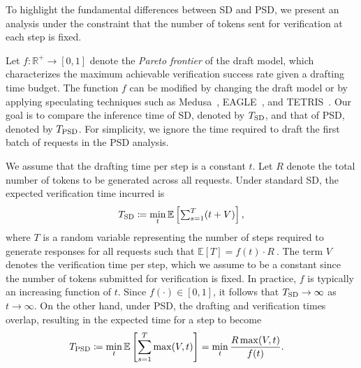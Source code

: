 

To highlight the fundamental differences between SD and PSD, we present an analysis under the constraint that the number of tokens sent for verification at each step is fixed.

Let $f: \mathbb{R}^+\to [0,1]$ denote the \textit{Pareto frontier} of the draft model, which characterizes the maximum achievable verification success rate given a drafting time budget. 
The function $f$ can be modified by changing the draft model or by applying speculating techniques such as Medusa~\citep{cai2024medusa}, EAGLE~\citep{li2024eagle}, and TETRIS~\citep{wu2025tetris}. 
Our goal is to compare the inference time of SD, denoted by $T_{\textnormal{\text{SD}}}$, and that of PSD, denoted by $T_{\textnormal{\text{PSD}}}$. For simplicity, we ignore the time required to draft the first batch of requests in the PSD analysis.


We assume that the drafting time per step is a constant $t$. Let $R$ denote the total number of tokens to be generated across all requests. Under standard SD, the expected verification time incurred is
\begin{equation*}
    \begin{aligned}
       \textstyle T_{\textnormal{\text{SD}}} \coloneqq \min\limits_t\mathbb{E}\left[\sum_{s=1}^T (t + V)\right],
    \end{aligned}
\end{equation*}
where $T$ is a random variable representing the number of steps required to generate responses for all requests such that $\mathbb{E}[T] = f(t) \cdot R\ $. The term $V$ denotes the verification time per step, which we assume to be a constant since the number of tokens submitted for verification is fixed. In practice, $f$ is typically an increasing function of $t$. Since $f(\cdot) \in [0, 1]$, it follows that $T_{\textnormal{\text{SD}}} \to \infty$ as $t \to \infty$. 
On the other hand, under PSD, the drafting and verification times overlap, resulting in the expected time for a step to become
\begin{equation*}
    \begin{aligned}
    \textstyle T_{\textnormal{\text{PSD}}} &\coloneqq \min_t\mathbb{E}\left[\sum_{s=1}^T\max(V, t)\right] = \min_t \frac{R\max(V, t)}{f(t)}.
    \end{aligned}
\end{equation*}

